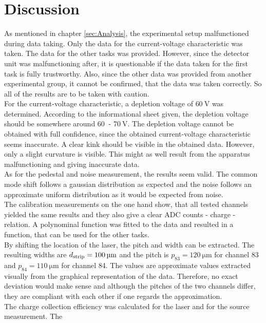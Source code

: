 \section{Discussion}
\label{sec:Discussion}
As mentioned in chapter \ref{sec:Analysis}, the experimental setup malfunctioned during data taking. Only
the data for the current-voltage characteristic was taken. The data for the other tasks was provided. However,
since the detector unit was malfunctioning after, it is questionable if the data taken for the first task is 
fully trustworthy. Also, since the other data was provided from another experimental group, it cannot be
confirmed, that the data was taken correctly. So all of the results are to be taken with caution.\\
For the current-voltage characteristic, a depletion voltage of $\qty{60}{\volt}$ was determined. According to the
informational sheet given, the depletion voltage should be somewhere around $\qty{60}{}$ - $\qty{70}{\volt}$\cite{SiliconStrip}.
The depletion voltage cannot be obtained with full confidence, since the obtained current-voltage characteristic
seems inaccurate. A clear kink should be visible in the obtained data. However, only a slight curvature is visible.
This might as well result from the apparatus malfunctioning and giving inaccurate data.\\
As for the pedestal and noise measurement, the results seem valid. The common mode shift follows a gaussian distribution
as expected and the noise follows an approximate uniform distribution as it would be expected from noise.\\
The calibration measurements on the one hand show, that all tested channels yielded the same results and 
they also give a clear ADC counts - charge - relation. A polynominal function was fitted to the data and
resulted in a function, that can be used for the other tasks.\\
By shifting the location of the laser, the pitch and width can be extracted. The resulting widths are $d_{\mathrm{strip}} = \qty{100 \pm 0}{\micro\metre}$
and the pitch is $p_{83} = \qty{120}{\micro\metre}$ for channel 83 and $p_{84} = \qty{110}{\micro\metre}$ for channel 84.
The values are approximate values extracted visually from the graphical representation of the data. Therefore, no exact
deviation would make sense and although the pitches of the two channels differ, they are compliant with each
other if one regards the approximation.\\
The charge collection efficiency was calculated for the laser and for the source measurement. The
